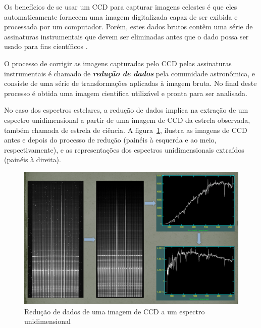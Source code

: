 Os benefícios de se usar um CCD para capturar imagens celestes é que eles automaticamente fornecem uma imagem digitalizada capaz de ser exibida e processada por um computador. Porém, estes dados brutos contêm uma série de assinaturas instrumentais que devem ser eliminadas antes que o dado possa ser usado para fins científicos \citep{davenhall20012}.  

O processo de corrigir as imagens capturadas pelo CCD pelas assinaturas instrumentais é chamado de \textbf{\textit{redução de dados}} pela comunidade astronômica, e consiste de uma série de transformações aplicadas à imagem bruta. No final deste processo é obtida uma imagem científica utilizável e pronta para ser analisada.

No caso dos espectros estelares, a redução de dados implica na extração de um espectro unidimensional a partir de uma imagem de CCD da estrela observada, também chamada de estrela de ciência. A figura~\ref{fig:calibration-steps}, ilustra as imagens de CCD antes e depois do processo de redução (painéis à esquerda e ao meio, respectivamente), e as representações dos espectros unidimensionais extraídos (painéis à direita).



\begin{figure}[htb]
\centering
\includegraphics[width=15cm]{figuras/calibration_steps.jpg}
\caption{Redução de dados de uma imagem de CCD a um espectro unidimensional \citep{data-reduction-image}}
\label{fig:calibration-steps}
\end{figure}

